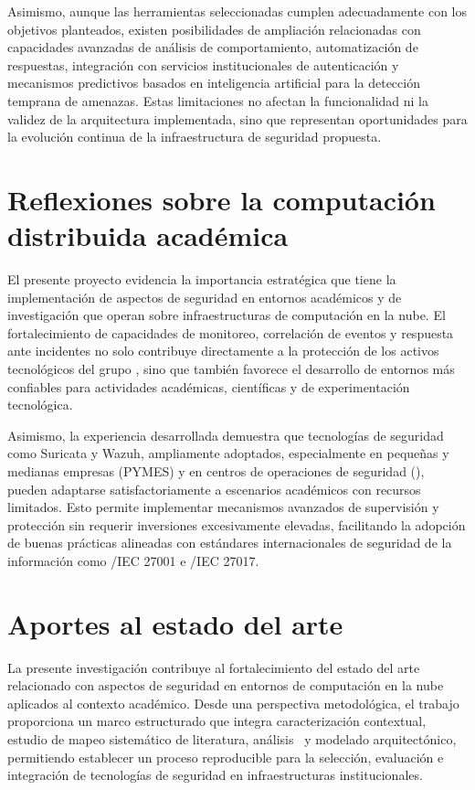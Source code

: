 Asimismo, aunque las herramientas seleccionadas cumplen adecuadamente con los objetivos planteados, existen posibilidades de ampliación 
relacionadas con capacidades avanzadas de análisis de comportamiento, automatización de respuestas, integración con servicios 
institucionales de autenticación y mecanismos predictivos basados en inteligencia artificial para la detección temprana de amenazas. Estas 
limitaciones no afectan la funcionalidad ni la validez de la arquitectura implementada, sino que representan oportunidades para la 
evolución continua de la infraestructura de seguridad propuesta.

\section{Reflexiones sobre la computación distribuida académica}
\noindent

El presente proyecto evidencia la importancia estratégica que tiene la implementación de aspectos de seguridad en entornos académicos 
y de investigación que operan sobre infraestructuras de computación en la nube. El fortalecimiento de capacidades de monitoreo, correlación 
de eventos y respuesta ante incidentes no solo contribuye directamente a la protección de los activos tecnológicos del grupo \GRID, sino 
que también favorece el desarrollo de entornos más confiables para actividades académicas, científicas y de experimentación tecnológica.

Asimismo, la experiencia desarrollada demuestra que tecnologías de seguridad como Suricata y Wazuh, ampliamente adoptados, especialmente 
en pequeñas y medianas empresas (PYMES) y en centros de operaciones de seguridad (\SOC), pueden adaptarse satisfactoriamente a escenarios 
académicos con recursos limitados. Esto permite implementar mecanismos avanzados de supervisión y protección sin requerir inversiones 
excesivamente elevadas, facilitando la adopción de buenas prácticas alineadas con estándares internacionales de seguridad de la 
información como \ISO/IEC 27001 e \ISO/IEC 27017.

\section{Aportes al estado del arte}
\noindent

La presente investigación contribuye al fortalecimiento del estado del arte relacionado con aspectos de seguridad en entornos de 
computación en la nube aplicados al contexto académico. Desde una perspectiva metodológica, el trabajo proporciona un marco estructurado 
que integra caracterización contextual, estudio de mapeo sistemático de literatura, análisis \DAR\ y modelado arquitectónico, permitiendo 
establecer un proceso reproducible para la selección, evaluación e integración de tecnologías de seguridad en infraestructuras 
institucionales.

